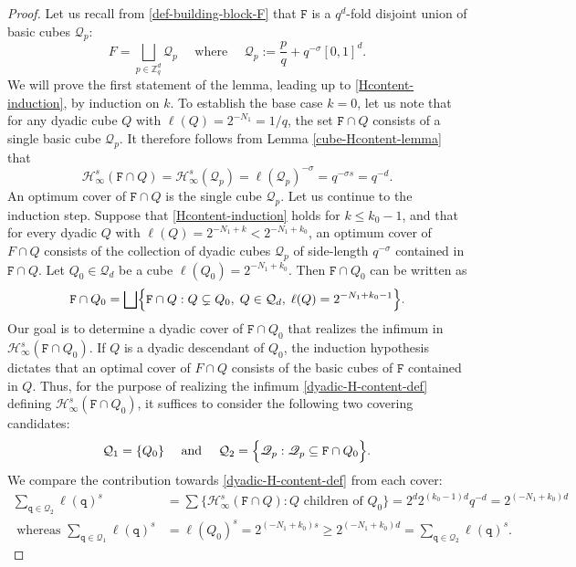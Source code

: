 \documentclass[a4paper,11pt]{amsart}
\numberwithin{equation}{section}
\begin{document}
\begin{proof} 
Let us recall from \eqref{def-building-block-F} that $\mathtt F$ is a $q^d$-fold disjoint union of basic cubes $\mathscr{Q}_p$:   
\[ F = \bigsqcup_{p \in \mathbb Z_q^d} \mathscr{Q}_p \quad \text{ where } \quad \mathscr{Q}_p := \frac{p}{q} + q^{-\sigma}[0,1]^d. \] 
We will prove the first statement of the lemma, leading up to \eqref{Hcontent-induction}, by induction on $k$. To establish the base case $k = 0$, let us note that for any dyadic cube $Q$ with $\ell(Q) = 2^{-N_1} = 1/q$, the set $\mathtt F \cap Q$ consists of a single basic cube $\mathscr{Q}_p$. It therefore follows from Lemma \ref{cube-Hcontent-lemma} that 
\[ \mathcal H_{\infty}^{s}(\mathtt F \cap Q) = \mathcal H_{\infty}^{s}(\mathscr{Q}_p) = \ell(\mathscr{Q}_p)^{-\sigma} = q^{-\sigma s} = q^{-d}. \] 
An optimum cover of $\mathtt F \cap Q$ is the single cube $\mathscr{Q}_p$. 
\vskip0.1in
\noindent Let us continue to the induction step. Suppose that \eqref{Hcontent-induction} holds for $k \leq k_0-1$, and that for every dyadic $Q$ with $\ell(Q) = 2^{-N_1+k} <  2^{-N_1+k_0}$, an optimum cover of  $F \cap Q$ consists of the collection of dyadic cubes $\mathscr{Q}_p$ of side-length $q^{-\sigma}$ contained in $\mathtt F \cap Q$. Let $Q_0 \in \mathcal Q_d$ be a cube $\ell(Q_0) = 2^{-N_1 + k_0}$. Then $\mathtt F \cap Q_0$ can be written as   
\[ \mathtt F \cap Q_0 = \bigsqcup \Bigl\{\mathtt F \cap Q : Q \subsetneq Q_0, \; Q \in \mathcal Q_d, \; \ell(Q) = 2^{-N_1 + k_0 -1}\Bigr\}.\] 
Our goal is to determine a dyadic cover of $\mathtt F \cap Q_0$ that realizes the infimum in $\mathcal H_{\infty}^s(\mathtt F \cap Q_0)$. If $Q$ is a dyadic descendant of $Q_0$, the induction hypothesis dictates that an optimal cover of $F \cap Q$ consists of the basic cubes of $\mathtt F$ contained in $Q$. Thus, for the purpose of realizing the infimum \eqref{dyadic-H-content-def} defining $\mathcal H_{\infty}^s(\mathtt F \cap Q_0)$, it suffices to consider the following two covering candidates:  
\[ \mathcal Q_1 = \{Q_0\} \quad \text{ and } \quad \mathcal Q_2 = \Bigl\{\mathscr{Q}_p : \mathscr{Q}_p \subseteq \mathtt F \cap Q_0 \Bigr\}.   \]  
We compare the contribution towards \eqref{dyadic-H-content-def} from each cover: 
\begin{align*} 
\sum_{\mathtt q \in \mathcal Q_2} \ell(\mathtt q)^s &= \sum \bigl\{ \mathcal H_{\infty}^s(\mathtt F \cap Q) : Q \text{ children of }Q_0 \bigr\} = 2^d 2^{(k_0-1)d} q^{-d} = 2^{(-N_1 + k_0) d}   \\ 
  \text{ whereas } \sum_{\mathtt q \in \mathcal Q_1} \ell(\mathtt q)^s &= \ell(Q_0)^s = 2^{(-N_1 + k_0)s} \geq  2^{(-N_1 + k_0) d} = \sum_{\mathtt q \in \mathcal Q_2}\ell(\mathtt q)^s. 

\end{align*}
\end{proof}
\end{document}
